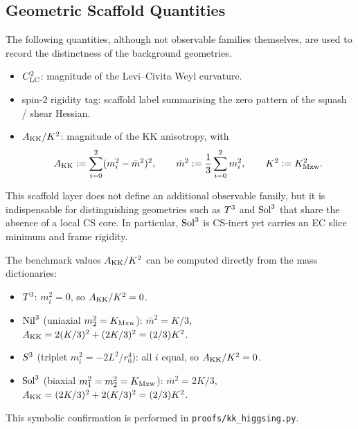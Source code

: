 \subsection{Geometric Scaffold Quantities}
\label{app:A:scaffold}

The following quantities, although not observable families themselves, are
used to record the distinctness of the background geometries.

\begin{itemize}
  \item $C^2_{\mathrm{LC}}$: magnitude of the Levi--Civita Weyl curvature.
  \item spin-2 rigidity tag: scaffold label summarising the zero pattern of
        the squash / shear Hessian.
  \item $A_{\mathrm{KK}} / K^2$: magnitude of the KK anisotropy, with
        \begin{equation}
          A_{\mathrm{KK}} := \sum_{i=0}^{2}(m_i^2 - \bar m^2)^2,
          \qquad
          \bar m^2 := \frac{1}{3}\sum_{i=0}^{2} m_i^2,
          \qquad
          K^2 := K_{\mathrm{Mxw}}^2.
        \end{equation}
\end{itemize}

This scaffold layer does not define an additional observable family, but it
is indispensable for distinguishing geometries such as $T^3$ and
$\mathrm{Sol}^3$ that share the absence of a local CS core.  In particular,
$\mathrm{Sol}^3$ is CS-inert yet carries an EC slice minimum and frame rigidity.

The benchmark values $A_{\mathrm{KK}} / K^2$ can be computed directly from the mass
dictionaries:

\begin{itemize}
  \item $T^3$: $m_i^2 = 0$, so $A_{\mathrm{KK}} / K^2 = 0$.
  \item $\mathrm{Nil}^3$ (uniaxial $m_2^2 = K_{\mathrm{Mxw}}$): $\bar m^2 = K/3$,
        $A_{\mathrm{KK}} = 2(K/3)^2 + (2K/3)^2 = (2/3)K^2$.
  \item $S^3$ (triplet $m_i^2 = -2L^2/r_0^4$): all $i$ equal, so
        $A_{\mathrm{KK}} / K^2 = 0$.
  \item $\mathrm{Sol}^3$ (biaxial $m_1^2 = m_2^2 = K_{\mathrm{Mxw}}$): $\bar m^2 = 2K/3$,
        $A_{\mathrm{KK}} = (2K/3)^2 + 2(K/3)^2 = (2/3)K^2$.
\end{itemize}

This symbolic confirmation is performed in
\texttt{proofs/kk\_higgsing.py}.
